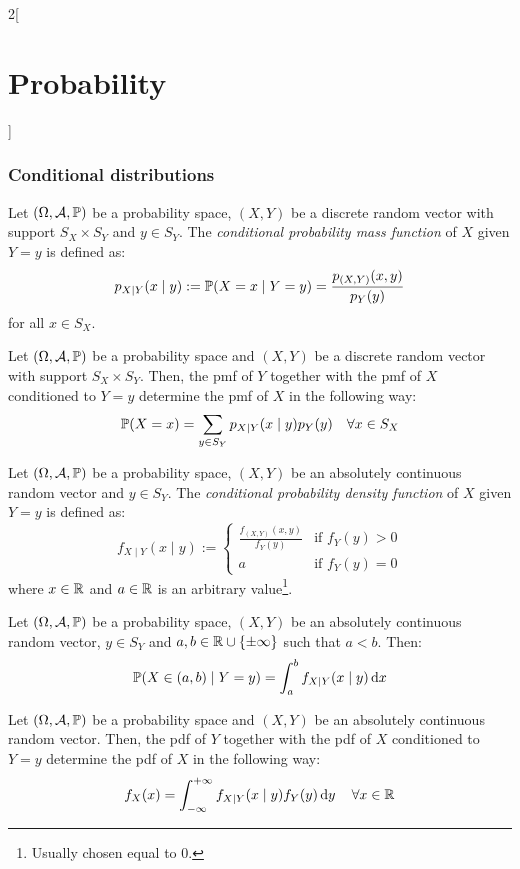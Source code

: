 \documentclass[../../../main_math.tex]{subfiles}
\begin{document}
\begin{multicols}{2}[\section{Probability}]
  \subsubsection{Conditional distributions}
  \begin{definition}
    Let $(\Omega,\mathcal{A},\mathbb{P})$ be a probability space, $(X,Y)$ be a discrete random vector with support $S_X\times S_Y$ and $y\in S_Y$. The \emph{conditional probability mass function} of $X$ given $Y=y$ is defined as: $$p_{X\mid Y}(x\mid y):=\mathbb{P}(X=x\mid Y=y)=\frac{p_{(X,Y)}(x,y)}{p_Y(y)}$$ for all $x\in S_X$.
  \end{definition}
  \begin{proposition}
    Let $(\Omega,\mathcal{A},\mathbb{P})$ be a probability space and $(X,Y)$ be a discrete random vector with support $S_X\times S_Y$. Then, the pmf of $Y$ together with the pmf of $X$ conditioned to $Y=y$ determine the pmf of $X$ in the following way: $$\mathbb{P}(X=x)=\sum_{y\in S_Y}p_{X\mid Y}(x\mid y)p_Y(y)\quad\forall x\in S_X$$
  \end{proposition}
  \begin{definition}
    Let $(\Omega,\mathcal{A},\mathbb{P})$ be a probability space, $(X,Y)$ be an absolutely continuous random vector and $y\in S_Y$. The \emph{conditional probability density function} of $X$ given $Y=y$ is defined as: $$f_{X\mid Y}(x\mid y):=
      \begin{cases}
        \frac{f_{(X,Y)}(x,y)}{f_Y(y)} & \text{if }f_Y(y)>0 \\
        a                             & \text{if }f_Y(y)=0
      \end{cases}
    $$ where $x\in\mathbb{R}$ and $a\in\mathbb{R}$ is an arbitrary value\footnote{Usually chosen equal to 0.}.
  \end{definition}
  \begin{proposition}
    Let $(\Omega,\mathcal{A},\mathbb{P})$ be a probability space, $(X,Y)$ be an absolutely continuous random vector, $y\in S_Y$ and $a,b\in\mathbb{R}\cup\{\pm\infty\}$ such that $a<b$. Then: $$\mathbb{P}(X\in(a,b)\mid Y=y)=\int_a^bf_{X\mid Y}(x\mid y)\dd{x}$$
  \end{proposition}
  \begin{proposition}
    Let $(\Omega,\mathcal{A},\mathbb{P})$ be a probability space and $(X,Y)$ be an absolutely continuous random vector. Then, the pdf of $Y$ together with the pdf of $X$ conditioned to $Y=y$ determine the pdf of $X$ in the following way: $$f_X(x)=\int_{-\infty}^{+\infty}f_{X\mid Y}(x\mid y)f_Y(y)\dd{y}\quad\forall x\in\mathbb{R}$$
  \end{proposition}

\end{multicols}
\end{document}
